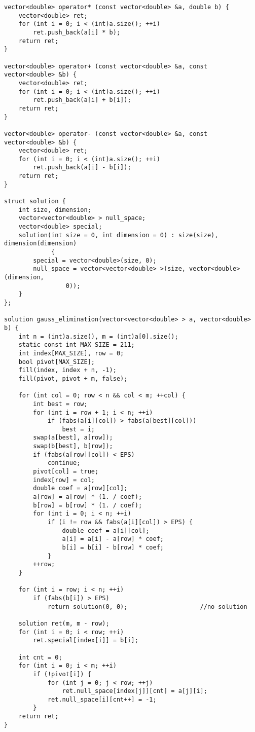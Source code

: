 \documentclass{article}
\begin{document}
\begin{lstlisting}
vector<double> operator* (const vector<double> &a, double b) {
    vector<double> ret;
    for (int i = 0; i < (int)a.size(); ++i)
        ret.push_back(a[i] * b);
    return ret;
}

vector<double> operator+ (const vector<double> &a, const vector<double> &b) {
    vector<double> ret;
    for (int i = 0; i < (int)a.size(); ++i)
        ret.push_back(a[i] + b[i]);
    return ret;
}

vector<double> operator- (const vector<double> &a, const vector<double> &b) {
    vector<double> ret;
    for (int i = 0; i < (int)a.size(); ++i)
        ret.push_back(a[i] - b[i]);
    return ret;
}

struct solution {
    int size, dimension;
    vector<vector<double> > null_space;
    vector<double> special;
    solution(int size = 0, int dimension = 0) : size(size), dimension(dimension)
             {
        special = vector<double>(size, 0);
        null_space = vector<vector<double> >(size, vector<double>(dimension,
                 0));
    }
};

solution gauss_elimination(vector<vector<double> > a, vector<double> b) {
    int n = (int)a.size(), m = (int)a[0].size();
    static const int MAX_SIZE = 211;
    int index[MAX_SIZE], row = 0;
    bool pivot[MAX_SIZE];
    fill(index, index + n, -1);
    fill(pivot, pivot + m, false);

    for (int col = 0; row < n && col < m; ++col) {
        int best = row;
        for (int i = row + 1; i < n; ++i)
            if (fabs(a[i][col]) > fabs(a[best][col]))
                best = i;
        swap(a[best], a[row]);
        swap(b[best], b[row]);
        if (fabs(a[row][col]) < EPS)
            continue;
        pivot[col] = true;
        index[row] = col;
        double coef = a[row][col];
        a[row] = a[row] * (1. / coef);
        b[row] = b[row] * (1. / coef);
        for (int i = 0; i < n; ++i)
            if (i != row && fabs(a[i][col]) > EPS) {
                double coef = a[i][col];
                a[i] = a[i] - a[row] * coef;
                b[i] = b[i] - b[row] * coef;
            }
        ++row;
    }

    for (int i = row; i < n; ++i)
        if (fabs(b[i]) > EPS)
            return solution(0, 0);                    //no solution

    solution ret(m, m - row);
    for (int i = 0; i < row; ++i)
        ret.special[index[i]] = b[i];

    int cnt = 0;
    for (int i = 0; i < m; ++i)
        if (!pivot[i]) {
            for (int j = 0; j < row; ++j)
                ret.null_space[index[j]][cnt] = a[j][i];
            ret.null_space[i][cnt++] = -1;
        }
    return ret;
}
\end{lstlisting}
\end{document}

